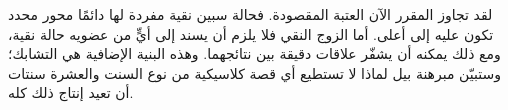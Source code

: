 \begin{classroomqa}
\end{classroomqa}

لقد تجاوز المقرر الآن العتبة المقصودة. فحالة سبين نقية مفردة لها دائمًا محور محدد تكون عليه إلى أعلى. أما الزوج النقي فلا يلزم أن يسند إلى أيٍّ من عضويه حالة نقية، ومع ذلك يمكنه أن يشفّر علاقات دقيقة بين نتائجهما. وهذه البنية الإضافية هي التشابك؛ وستبيّن مبرهنة بيل لماذا لا تستطيع أي قصة كلاسيكية من نوع السنت والعشرة سنتات أن تعيد إنتاج ذلك كله.
